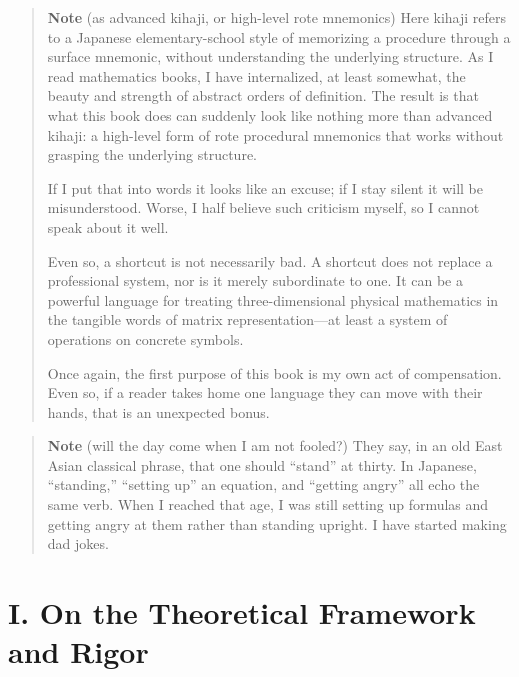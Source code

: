 \documentclass[a4paper,12pt,openany]{book}
\begin{document}
\begin{quote}
\textbf{Note} (as advanced kihaji, or high-level rote mnemonics) Here
kihaji refers to a Japanese elementary-school style of memorizing a
procedure through a surface mnemonic, without understanding the
underlying structure. As I read mathematics books, I have internalized,
at least somewhat, the beauty and strength of abstract orders of
definition. The result is that what this book does can suddenly look
like nothing more than advanced kihaji: a high-level form of rote
procedural mnemonics that works without grasping the underlying
structure.

If I put that into words it looks like an excuse; if I stay silent it
will be misunderstood. Worse, I half believe such criticism myself, so I
cannot speak about it well.

Even so, a shortcut is not necessarily bad. A shortcut does not replace
a professional system, nor is it merely subordinate to one. It can be a
powerful language for treating three-dimensional physical mathematics in
the tangible words of matrix representation—at least a system of
operations on concrete symbols.

Once again, the first purpose of this book is my own act of
compensation. Even so, if a reader takes home one language they can move
with their hands, that is an unexpected bonus.
\end{quote}

\begin{quote}
\textbf{Note} (will the day come when I am not fooled?) They say, in an
old East Asian classical phrase, that one should ``stand'' at thirty. In
Japanese, ``standing,'' ``setting up'' an equation, and ``getting
angry'' all echo the same verb. When I reached that age, I was still
setting up formulas and getting angry at them rather than standing
upright. I have started making dad jokes.
\end{quote}

\par\vspace{0.35em}\par

\hypertarget{i.-on-the-theoretical-framework-and-rigor}{%
\section{I. On the Theoretical Framework and
Rigor}\label{i.-on-the-theoretical-framework-and-rigor}}
\end{document}
